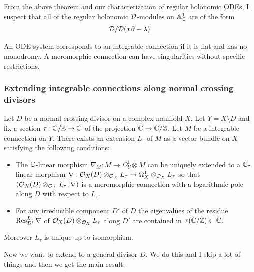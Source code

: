 \begin{remark}
	 From the above theorem and our characterization
	of regular holonomic ODEs, I suspect that all of the regular
	holonomic ${\mathcal{D}}$-modules on $\mathbb{A}^1_{\mathbb{C}}$ are of the form \begin{align*}
		{\mathcal{D}}/{\mathcal{D}} (x\partial - \lambda)
	\end{align*}
\end{remark}

\begin{remark}
	An ODE system corresponds to an integrable connection if it is flat and has
	no monodromy. 
	A meromorphic connection can have singularities without specific restrictions.

\end{remark}

\subsubsection{Extending integrable connections along normal crossing divisors}
\begin{theorem}
    Let $D$ be a normal crossing divisor on a complex manifold $X$.
    Let $Y = X\setminus D$ and fix a section $\tau:\mathbb{C}/\mathbb{Z}\to \mathbb{C}$ of the 
    projection $\mathbb{C}\to \mathbb{C}/\mathbb{Z}$. Let $M$ be a integrable connection on $Y$.
    There exists an extension $L_\tau$ of $M$ as a vector bundle on $X$ 
    satisfying the following conditions: \begin{itemize}
        \item The $\mathbb{C}$-linear morphism $\nabla_M:M \to \Omega^1_Y\otimes M$
        can be uniquely extended to a $\mathbb{C}$-linear morphism 
        $\nabla:{\mathcal{O}}_X(D) \otimes_{{\mathcal{O}}_X} L_\tau \to \Omega^1_X\otimes_{{\mathcal{O}}_X} L_\tau$
        so that $({\mathcal{O}}_X(D)\otimes_{{\mathcal{O}}_X} L_\tau,\nabla)$ is a meromorphic connection
        with a logarithmic pole along $D$ with respect to $L_\tau$.
        \item For any irreducible component $D'$ of $D$ the eigenvalues of the residue
        $\operatorname{Res}_{D'}^{L_\tau}\nabla$ of ${\mathcal{O}}_X(D)\otimes_{{\mathcal{O}}_X} L_\tau$ along $D'$
        are contained in $\tau(\mathbb{C}/\mathbb{Z}) \subset \mathbb{C}$.
    \end{itemize}
Moreover $L_\tau$ is unique up to isomorphism.
\end{theorem}

Now we want to extend to a general divisor $D$. We do this 
and I skip a lot of things and then we get the main result:

